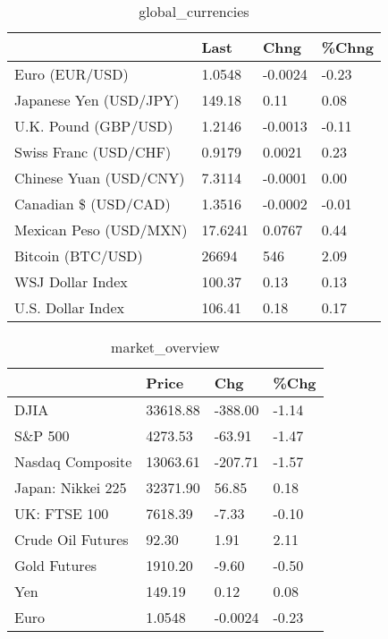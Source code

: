 \documentclass{article}%
\begin{document}
%


\begin{table}[htbp]%
\caption{global\_currencies}%
\centering%
\begin{adjustbox}{width=1\textwidth}%
\begin{tabular}{llll}
\toprule
                       &    Last &    Chng & \%Chng \\
\midrule
        Euro (EUR/USD) &  1.0548 & -0.0024 & -0.23 \\
Japanese Yen (USD/JPY) &  149.18 &    0.11 &  0.08 \\
  U.K. Pound (GBP/USD) &  1.2146 & -0.0013 & -0.11 \\
 Swiss Franc (USD/CHF) &  0.9179 &  0.0021 &  0.23 \\
Chinese Yuan (USD/CNY) &  7.3114 & -0.0001 &  0.00 \\
  Canadian \$ (USD/CAD) &  1.3516 & -0.0002 & -0.01 \\
Mexican Peso (USD/MXN) & 17.6241 &  0.0767 &  0.44 \\
     Bitcoin (BTC/USD) &   26694 &     546 &  2.09 \\
      WSJ Dollar Index &  100.37 &    0.13 &  0.13 \\
     U.S. Dollar Index &  106.41 &    0.18 &  0.17 \\
\bottomrule
\end{tabular}
%
\end{adjustbox}%
\end{table}

%


\begin{table}[htbp]%
\caption{market\_overview}%
\centering%
\begin{adjustbox}{width=1\textwidth}%
\begin{tabular}{llll}
\toprule
                  &    Price &     Chg &  \%Chg \\
\midrule
             DJIA & 33618.88 & -388.00 & -1.14 \\
          S\&P 500 &  4273.53 &  -63.91 & -1.47 \\
 Nasdaq Composite & 13063.61 & -207.71 & -1.57 \\
Japan: Nikkei 225 & 32371.90 &   56.85 &  0.18 \\
     UK: FTSE 100 &  7618.39 &   -7.33 & -0.10 \\
Crude Oil Futures &    92.30 &    1.91 &  2.11 \\
     Gold Futures &  1910.20 &   -9.60 & -0.50 \\
              Yen &   149.19 &    0.12 &  0.08 \\
             Euro &   1.0548 & -0.0024 & -0.23 \\
\bottomrule
\end{tabular}
%
\end{adjustbox}%
\end{table}

%
\end{document}
